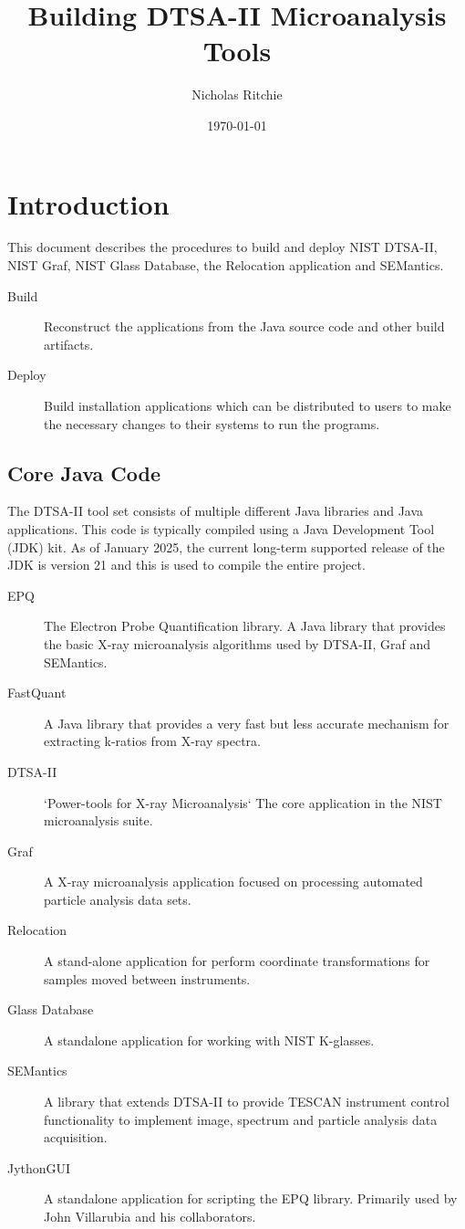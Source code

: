 \documentclass{article}
\title{Building DTSA-II Microanalysis Tools}
\author{Nicholas Ritchie}
\date{\today}
\begin{document}
\maketitle

\section{Introduction}
This document describes the procedures to build and deploy NIST DTSA-II, NIST Graf, NIST Glass Database, the Relocation application and SEMantics.

\begin{description}
    \item[Build] Reconstruct the applications from the Java source code and other build artifacts.
    \item[Deploy] Build installation applications which can be distributed to users to make the necessary changes to their systems to run the programs.
\end{description}

\subsection{Core Java Code}
The DTSA-II tool set consists of multiple different Java libraries and Java applications.  This code is typically compiled using a Java Development Tool (JDK) kit. As of January 2025, the current long-term supported release of the JDK is version 21 and this is used to compile the entire project.

\begin{description}
    \item[EPQ] The Electron Probe Quantification library.  A Java library that provides the basic X-ray microanalysis algorithms used by DTSA-II, Graf and SEMantics.
    \item[FastQuant] A Java library that provides a very fast but less accurate mechanism for extracting k-ratios from X-ray spectra.
    \item[DTSA-II] `Power-tools for X-ray Microanalysis` The core application in the NIST microanalysis suite.
    \item[Graf] A X-ray microanalysis application focused on processing automated particle analysis data sets.
    \item[Relocation] A stand-alone application for perform coordinate transformations for samples moved between instruments.
    \item[Glass Database] A standalone application for working with NIST K-glasses.
    \item[SEMantics] A library that extends DTSA-II to provide TESCAN instrument control functionality to implement image, spectrum and particle analysis data acquisition.
    \item[JythonGUI] A standalone application for scripting the EPQ library.  Primarily used by John Villarubia and his collaborators.
\end{description}
\end{document}
